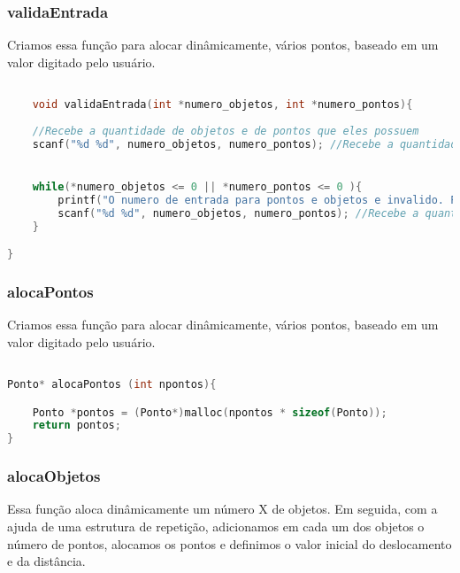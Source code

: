 \documentclass{article}
\begin{document}
\subsubsection{validaEntrada}

Criamos essa função para alocar dinâmicamente, vários pontos, baseado em um valor digitado pelo usuário.

\begin{lstlisting}[caption={Função validaEntrada},label={lst:cod2},language=C]

    void validaEntrada(int *numero_objetos, int *numero_pontos){
    
    //Recebe a quantidade de objetos e de pontos que eles possuem
    scanf("%d %d", numero_objetos, numero_pontos); //Recebe a quantidade de objetos e de pontos que eles possuem


    while(*numero_objetos <= 0 || *numero_pontos <= 0 ){
        printf("O numero de entrada para pontos e objetos e invalido. Por favor digite novamente.\n");
        scanf("%d %d", numero_objetos, numero_pontos); //Recebe a quantidade de objetos e de pontos que eles possuem
    }

}
\end{lstlisting}



\subsubsection{alocaPontos}

Criamos essa função para alocar dinâmicamente, vários pontos, baseado em um valor digitado pelo usuário.

\begin{lstlisting}[caption={Função alocaPontos},label={lst:cod2},language=C]

Ponto* alocaPontos (int npontos){

    Ponto *pontos = (Ponto*)malloc(npontos * sizeof(Ponto));
    return pontos;
}

\end{lstlisting}

\subsubsection{alocaObjetos}

Essa função aloca dinâmicamente um número X de objetos. Em seguida, com a ajuda de
uma estrutura de repetição, adicionamos em cada um dos objetos o número de pontos,
alocamos os pontos e definimos o valor inicial do deslocamento e da distância.
\end{document}
